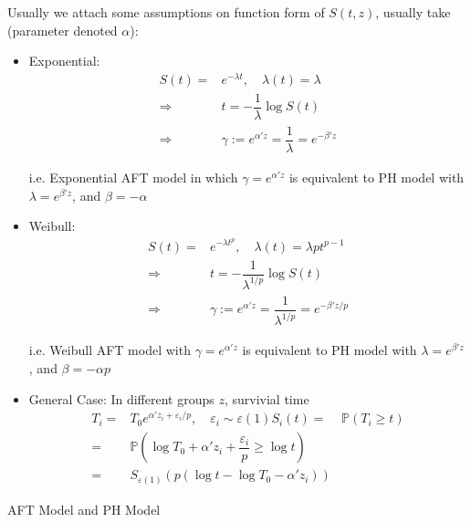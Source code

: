     Usually we attach some assumptions on function form of $ S(t,z) $, usually take (parameter denoted $ \alpha  $):
\begin{itemize}[topsep=2pt,itemsep=0pt]
    \item Exponential:
    \begin{align}
        S(t)=&e^{-\lambda t},\quad \lambda (t)=\lambda \\
        \Rightarrow &t=-\dfrac{1}{\lambda }\log S(t)\\
        \Rightarrow &\gamma :=e^{\alpha 'z}=\dfrac{1}{\lambda }=e^{-\beta 'z}
    \end{align}

    i.e. Exponential AFT model in which $ \gamma =e^{\alpha 'z} $ is equivalent to PH model with $ \lambda =e^{\beta 'z} $, and $ \beta =-\alpha  $ 
    
    \item Weibull:
    \begin{align}
        S(t)=&e^{-\lambda t^p},\quad \lambda (t)=\lambda pt^{p-1}\\
        \Rightarrow &t=-\dfrac{1}{\lambda ^{1/p}}\log S(t)\\
        \Rightarrow &\gamma :=e^{\alpha 'z}=\dfrac{1}{\lambda ^{1/p}}=e^{-\beta 'z/p}
    \end{align}
    
    i.e. Weibull AFT model with $ \gamma =e^{\alpha 'z} $ is equivalent to PH model with $ \lambda =e^{\beta 'z} $, and $ \beta =-\alpha p $
    
    \item General Case: In different groups $ z $, survivial time 
    \begin{align}
        T_i=&T_0e^{\alpha 'z_i+ \varepsilon _i/p },\quad \varepsilon _i\sim \varepsilon (1)
        S_i(t)=&\mathbb{P}\left( T_i\geq t \right)\\
        =&\mathbb{P}\left( \log T_0 +\alpha 'z_i+\dfrac{\varepsilon _i}{p}\geq  \log t \right)  \\
        =&S_{\varepsilon (1)}\left(p({\log t-\log T_0-\alpha 'z_i})\right)
    \end{align}
    
    
    
    
\end{itemize}


\begin{point}
    AFT Model and PH Model
\end{point}

